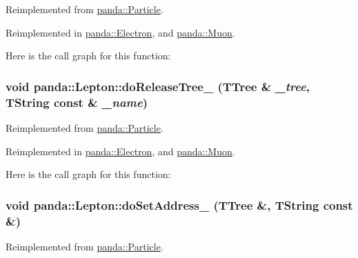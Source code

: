 Reimplemented from \hyperlink{classpanda_1_1Particle_a3c8e5de4513c492b0bad74e5ba551775}{panda::Particle}.

Reimplemented in \hyperlink{classpanda_1_1Electron_a87826542cbfbde4305c312ffa677d1bf}{panda::Electron}, and \hyperlink{classpanda_1_1Muon_a50a228225667669a6fa827d426740e70}{panda::Muon}.

Here is the call graph for this function:\hypertarget{classpanda_1_1Lepton_ae0f913947dcc9e3827de846e7b885280}{
\subsubsection[{doReleaseTree\_\-}]{\setlength{\rightskip}{0pt plus 5cm}void panda::Lepton::doReleaseTree\_\- (TTree \& {\em \_\-tree}, \/  TString const \& {\em \_\-name})}}
\label{classpanda_1_1Lepton_ae0f913947dcc9e3827de846e7b885280}


Reimplemented from \hyperlink{classpanda_1_1Particle_aff400fb217d44df886826a4ac1f4ca9b}{panda::Particle}.

Reimplemented in \hyperlink{classpanda_1_1Electron_a728ea4bc877ba68f1a8e7301ea712871}{panda::Electron}, and \hyperlink{classpanda_1_1Muon_ab6aedf6cd1f1714f4cd3b315cee18c8d}{panda::Muon}.

Here is the call graph for this function:\hypertarget{classpanda_1_1Lepton_a2d46b07ce93bec008954f222c6860ff9}{
\subsubsection[{doSetAddress\_\-}]{\setlength{\rightskip}{0pt plus 5cm}void panda::Lepton::doSetAddress\_\- (TTree \&, \/  TString const \&)}}
\label{classpanda_1_1Lepton_a2d46b07ce93bec008954f222c6860ff9}


Reimplemented from \hyperlink{classpanda_1_1Particle_a96e604e87ef1bc5931b4cd3da447b084}{panda::Particle}.

